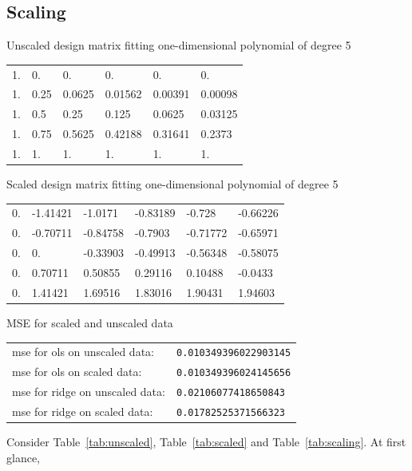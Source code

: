 \documentclass[twoside,11pt]{report}
\begin{document}
\subsection{Scaling}
\label{sec:scaling}


\begin{mytable}[float=!h, label=tab:unscaled]{Unscaled design matrix fitting one-dimensional polynomial of degree 5}
\tt
\centering
\begin{tabular}{llllll}
    1. &     0.  &    0.  &    0.   &   0.   &   0.     \\
    1. &     0.25 &   0.0625 & 0.01562& 0.00391& 0.00098\\
    1.    &  0.5     &0.25 &   0.125 &  0.0625 & 0.03125\\
    1.   &   0.75  &  0.5625 & 0.42188 &0.31641& 0.2373 \\
    1.  &    1.   &   1.  &    1.  &    1.    &  1.
\end{tabular}%
\end{mytable}
\begin{mytable}[float=!h,label=tab:scaled]{Scaled design matrix fitting one-dimensional polynomial of degree 5}
\tt
\centering
\begin{tabular}{llllll}
     0. &     -1.41421& -1.0171&  -0.83189& -0.728 &  -0.66226\\
     0.  &    -0.70711& -0.84758& -0.7903 & -0.71772& -0.65971\\
     0.  &     0.    &  -0.33903& -0.49913& -0.56348& -0.58075\\
     0.  &     0.70711&  0.50855&  0.29116 & 0.10488& -0.0433 \\
     0.  &     1.41421&  1.69516 & 1.83016 & 1.90431&  1.94603
\end{tabular}%
\end{mytable}
\begin{mytable}[float=!h,label=tab:scaling]{MSE for scaled and unscaled data}
\centering
\begin{tabular}{ll}
mse for ols on unscaled data:    &   \texttt{0.010349396022903145} \\
mse for ols on scaled data:      &   \texttt{0.010349396024145656} \\
mse for ridge on unscaled data:  &   \texttt{0.02106077418650843} \\
mse for ridge on scaled data:    &   \texttt{0.01782525371566323}
\end{tabular}%
\end{mytable}
Consider Table~\ref{tab:unscaled}, Table~\ref{tab:scaled} and Table~\ref{tab:scaling}. At first glance, 
\end{document}
